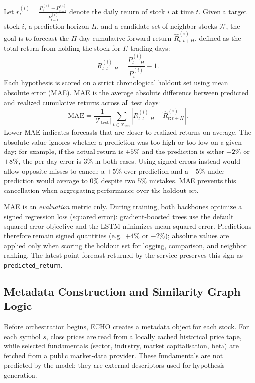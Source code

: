 \documentclass[12pt,a4paper,titlepage]{article}
\begin{document}
Let \( r_t^{(i)} = \frac{P_t^{(i)} - P_{t-1}^{(i)}}{P_{t-1}^{(i)}} \) denote the daily return of stock \( i \) at time \( t \). Given a target stock \( i \), a prediction horizon \( H \), and a candidate set of neighbor stocks \( \mathcal{N} \), the goal is to forecast the \( H \)-day cumulative forward return \( \hat{R}_{t:t+H}^{(i)} \), defined as the total return from holding the stock for \( H \) trading days:
\[
R_{t:t+H}^{(i)} = \frac{P_{t+H}^{(i)}}{P_t^{(i)}} - 1.
\]
Each hypothesis is scored on a strict chronological holdout set using mean absolute error (MAE). MAE is the average absolute difference between predicted and realized cumulative returns across all test days:
\[
\text{MAE} = \frac{1}{|\mathcal{T}_{\text{test}}|} \sum_{t \in \mathcal{T}_{\text{test}}} \left| R_{t:t+H}^{(i)} - \hat{R}_{t:t+H}^{(i)} \right|.
\]
Lower MAE indicates forecasts that are closer to realized returns on average. The absolute value ignores whether a prediction was too high or too low on a given day; for example, if the actual return is $+5\%$ and the prediction is either $+2\%$ or $+8\%$, the per-day error is $3\%$ in both cases. Using signed errors instead would allow opposite misses to cancel: a $+5\%$ over-prediction and a $-5\%$ under-prediction would average to $0\%$ despite two $5\%$ mistakes. MAE prevents this cancellation when aggregating performance over the holdout set.

MAE is an \emph{evaluation} metric only. During training, both backbones optimize a signed regression loss (squared error): gradient-boosted trees use the default squared-error objective and the LSTM minimizes mean squared error. Predictions therefore remain signed quantities (e.g.\ $+4\%$ or $-2\%$); absolute values are applied only when scoring the holdout set for logging, comparison, and neighbor ranking. The latest-point forecast returned by the service preserves this sign as \texttt{predicted\_return}.

\subsection{Metadata Construction and Similarity Graph Logic}

Before orchestration begins, ECHO creates a metadata object for each stock. For each symbol \(s\), close prices are read from a locally cached historical price tape, while selected fundamentals (sector, industry, market capitalisation, beta) are fetched from a public market-data provider. These fundamentals are not predicted by the model; they are external descriptors used for hypothesis generation.
\end{document}
